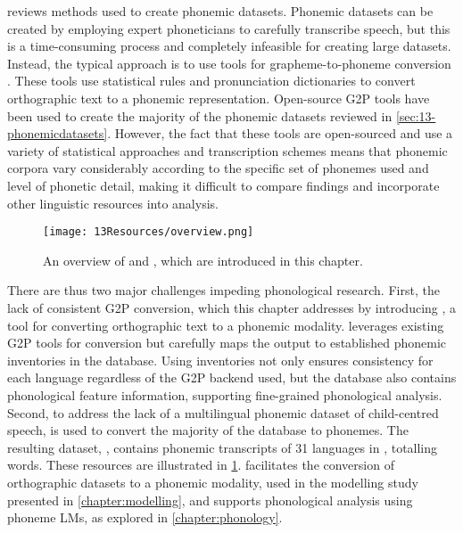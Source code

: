  reviews methods used to create phonemic datasets. Phonemic datasets can be created by employing expert phoneticians to carefully transcribe speech, but this is a time-consuming process and completely infeasible for creating large datasets. Instead, the typical approach is to use tools for grapheme-to-phoneme conversion \citep[G2P;][]{lucassen1984information}. These tools use statistical rules and pronunciation dictionaries to convert orthographic text to a phonemic representation. Open-source G2P tools have been used to create the majority of the phonemic datasets reviewed in \cref{sec:13-phonemicdatasets}. However, the fact that these tools are open-sourced and use a variety of statistical approaches and transcription schemes means that phonemic corpora vary considerably according to the specific set of phonemes used and level of phonetic detail, making it difficult to compare findings and incorporate other linguistic resources into analysis.

\begin{figure}[t]
    \centering
    \texttt{[image: 13Resources/overview.png]}
    \caption{An overview of \ipachildes and \gpp, which are introduced in this chapter.}
    \label{fig:13-overview}
\end{figure}

There are thus two major challenges impeding phonological research. First, the lack of consistent G2P conversion, which this chapter addresses by introducing \gpp, a tool for converting orthographic text to a phonemic modality. \gpp leverages existing G2P tools for conversion but carefully maps the output to established phonemic inventories in the \phoible database. Using \phoible inventories not only ensures consistency for each language regardless of the G2P backend used, but the database also contains phonological feature information, supporting fine-grained phonological analysis. Second, to address the lack of a multilingual phonemic dataset of child-centred speech, \gpp is used to convert the majority of the \childes database to phonemes. The resulting dataset, \ipachildes, contains phonemic transcripts of 31 languages in \childes, totalling  words. These resources are illustrated in \cref{fig:13-overview}. \gpp facilitates the conversion of orthographic datasets to a phonemic modality, used in the modelling study presented in \cref{chapter:modelling}, and \ipachildes supports phonological analysis using phoneme LMs, as explored in \cref{chapter:phonology}.

